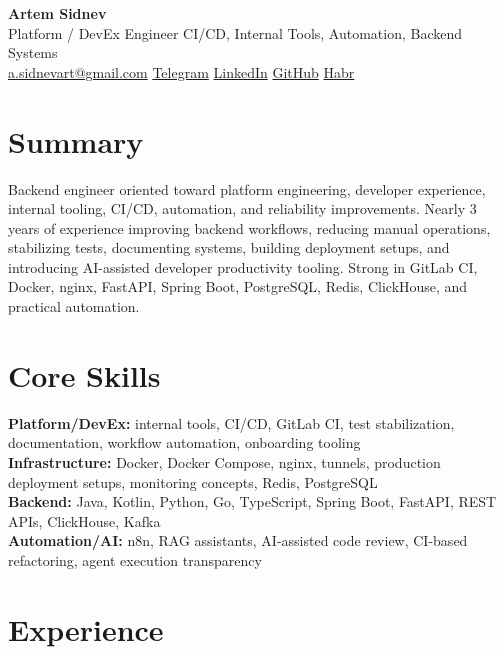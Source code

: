 \documentclass[10pt,a4paper]{article}
\begin{document}
\small

\begin{center}
{\LARGE \textbf{Artem Sidnev}}\\[0.18em]
{\normalsize Platform / DevEx Engineer \textbar{} CI/CD, Internal Tools, Automation, Backend Systems}\\[0.32em]
{\footnotesize
\href{mailto:a.sidnevart@gmail.com}{a.sidnevart@gmail.com}
\enspace\textbar\enspace
\href{https://t.me/sidnevart}{Telegram}
\enspace\textbar\enspace
\href{https://www.linkedin.com/in/artem-sidnev}{LinkedIn}
\enspace\textbar\enspace
\href{https://github.com/sidnevart}{GitHub}
\enspace\textbar\enspace
\href{https://habr.com/ru/users/sidnevart/}{Habr}
}
\end{center}

\section*{Summary}
Backend engineer oriented toward platform engineering, developer experience, internal tooling, CI/CD, automation, and reliability improvements. Nearly 3 years of experience improving backend workflows, reducing manual operations, stabilizing tests, documenting systems, building deployment setups, and introducing AI-assisted developer productivity tooling. Strong in GitLab CI, Docker, nginx, FastAPI, Spring Boot, PostgreSQL, Redis, ClickHouse, and practical automation.

\section*{Core Skills}
\textbf{Platform/DevEx:} internal tools, CI/CD, GitLab CI, test stabilization, documentation, workflow automation, onboarding tooling \\
\textbf{Infrastructure:} Docker, Docker Compose, nginx, tunnels, production deployment setups, monitoring concepts, Redis, PostgreSQL \\
\textbf{Backend:} Java, Kotlin, Python, Go, TypeScript, Spring Boot, FastAPI, REST APIs, ClickHouse, Kafka \\
\textbf{Automation/AI:} n8n, RAG assistants, AI-assisted code review, CI-based refactoring, agent execution transparency

\section*{Experience}
\end{document}
